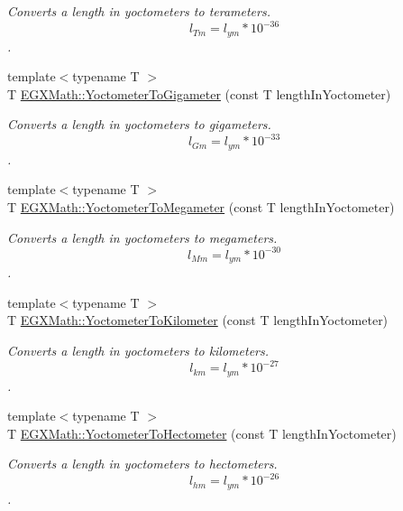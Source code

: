 \begin{DoxyCompactItemize}
\begin{DoxyCompactList}\small\item\em Converts a length in yoctometers to terameters. \[ l_{Tm}=l_{ym} * 10^{-36} \]. \end{DoxyCompactList}\item 
{\footnotesize template$<$typename T $>$ }\\T \mbox{\hyperlink{group___e_g_x_math-_conversions-_length_conversions-_s_i-_yoctometer-_s_i_ga48f8e5df818edfde1006bf08ebdeee33}{E\+G\+X\+Math\+::\+Yoctometer\+To\+Gigameter}} (const T length\+In\+Yoctometer)
\begin{DoxyCompactList}\small\item\em Converts a length in yoctometers to gigameters. \[ l_{Gm}=l_{ym} * 10^{-33} \]. \end{DoxyCompactList}\item 
{\footnotesize template$<$typename T $>$ }\\T \mbox{\hyperlink{group___e_g_x_math-_conversions-_length_conversions-_s_i-_yoctometer-_s_i_ga638081d766f4299ceede9574c1c3242b}{E\+G\+X\+Math\+::\+Yoctometer\+To\+Megameter}} (const T length\+In\+Yoctometer)
\begin{DoxyCompactList}\small\item\em Converts a length in yoctometers to megameters. \[ l_{Mm}=l_{ym} * 10^{-30} \]. \end{DoxyCompactList}\item 
{\footnotesize template$<$typename T $>$ }\\T \mbox{\hyperlink{group___e_g_x_math-_conversions-_length_conversions-_s_i-_yoctometer-_s_i_ga5736155a6aad5dc3b7b98706bda51484}{E\+G\+X\+Math\+::\+Yoctometer\+To\+Kilometer}} (const T length\+In\+Yoctometer)
\begin{DoxyCompactList}\small\item\em Converts a length in yoctometers to kilometers. \[ l_{km}=l_{ym} * 10^{-27} \]. \end{DoxyCompactList}\item 
{\footnotesize template$<$typename T $>$ }\\T \mbox{\hyperlink{group___e_g_x_math-_conversions-_length_conversions-_s_i-_yoctometer-_s_i_ga3f2a47723b097c9c2b38edf4ca14ff03}{E\+G\+X\+Math\+::\+Yoctometer\+To\+Hectometer}} (const T length\+In\+Yoctometer)
\begin{DoxyCompactList}\small\item\em Converts a length in yoctometers to hectometers. \[ l_{hm}=l_{ym} * 10^{-26} \]. \end{DoxyCompactList}\item 

\end{DoxyCompactItemize}
